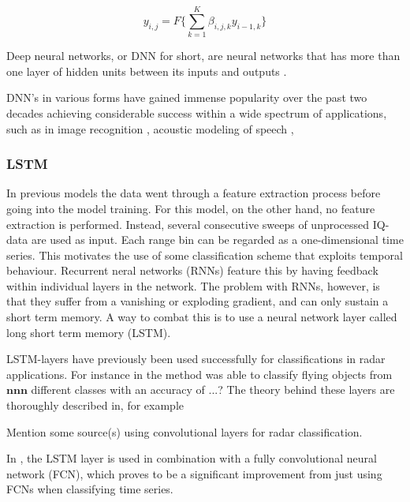 \begin{equation}
	y_{i,j} = F\Big\{\sum_{k=1}^{K}\beta_{i,j,k}y_{i-1,k}\Big\}
\end{equation}




Deep neural networks, or DNN for short, are neural networks that has more than one layer of hidden units between its inputs and outputs \citep{hinton_deng_yu_dahl_mohamed_jaitly_senior_vanhoucke_nguyen_sainath_2012}. 


DNN's in various forms have gained immense popularity over the past two decades achieving considerable success within a wide spectrum of applications, such as in image recognition \citep{szegedy_liu_jia_sermanet_reed_anguelov_erhan_vanhoucke_rabinovich_2018}, acoustic modeling of speech \citep{hinton_deng_yu_dahl_mohamed_jaitly_senior_vanhoucke_nguyen_sainath_2012}, 

\subsubsection{LSTM}

In previous models the data went through a feature extraction process before going into the model training. For this model, on the other hand, no feature extraction is performed. Instead, several consecutive sweeps of unprocessed IQ-data are used as input. Each range bin can be regarded as a one-dimensional time series. This motivates the use of some classification scheme that exploits temporal behaviour. Recurrent neral networks (RNNs) feature this by having feedback within individual layers in the network. \citep{karim_majumdar_darabi_chen_2018} The problem with RNNs, however, is that they suffer from a vanishing or exploding gradient, and can only sustain a short term memory. A way to combat this is to use a neural network layer called long short term memory (LSTM).

LSTM-layers have previously been used successfully for classifications in radar applications. For instance in \citep{jithesh_sagayaraj_srinivasa_2018} the method was able to classify flying objects from $\textbf{nnn}$ different classes with an accuracy of ...? The theory behind these layers are thoroughly described in, for example \citep{hochreiter_schmidhuber_1997}

Mention some source(s) using convolutional layers for radar classification.

 In \citep{karim_majumdar_darabi_chen_2018}, the LSTM layer is used in combination with a fully convolutional neural network (FCN), which proves to be a significant improvement from just using FCNs when classifying time series.

